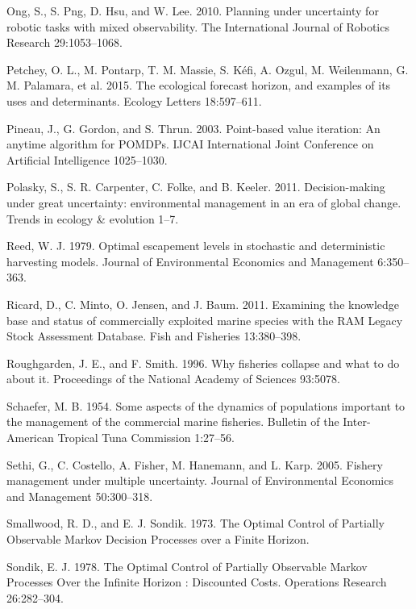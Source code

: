 \documentclass[3p]{elsarticle} %
\begin{document}
\hypertarget{ref-Ong2010}{}
Ong, S., S. Png, D. Hsu, and W. Lee. 2010. Planning under uncertainty
for robotic tasks with mixed observability. The International Journal of
Robotics Research 29:1053--1068.

\hypertarget{ref-Petchy2015}{}
Petchey, O. L., M. Pontarp, T. M. Massie, S. Kéfi, A. Ozgul, M.
Weilenmann, G. M. Palamara, et al. 2015. The ecological forecast
horizon, and examples of its uses and determinants. Ecology Letters
18:597--611.

\hypertarget{ref-Pineau2003}{}
Pineau, J., G. Gordon, and S. Thrun. 2003. Point-based value iteration:
An anytime algorithm for POMDPs. IJCAI International Joint Conference on
Artificial Intelligence 1025--1030.

\hypertarget{ref-Polasky2011}{}
Polasky, S., S. R. Carpenter, C. Folke, and B. Keeler. 2011.
Decision-making under great uncertainty: environmental management in an
era of global change. Trends in ecology \& evolution 1--7.

\hypertarget{ref-Reed1979}{}
Reed, W. J. 1979. Optimal escapement levels in stochastic and
deterministic harvesting models. Journal of Environmental Economics and
Management 6:350--363.

\hypertarget{ref-RAM}{}
Ricard, D., C. Minto, O. Jensen, and J. Baum. 2011. Examining the
knowledge base and status of commercially exploited marine species with
the RAM Legacy Stock Assessment Database. Fish and Fisheries
13:380--398.

\hypertarget{ref-Roughgarden1996}{}
Roughgarden, J. E., and F. Smith. 1996. Why fisheries collapse and what
to do about it. Proceedings of the National Academy of Sciences 93:5078.

\hypertarget{ref-Schaefer1954}{}
Schaefer, M. B. 1954. Some aspects of the dynamics of populations
important to the management of the commercial marine fisheries. Bulletin
of the Inter-American Tropical Tuna Commission 1:27--56.

\hypertarget{ref-Sethi2005}{}
Sethi, G., C. Costello, A. Fisher, M. Hanemann, and L. Karp. 2005.
Fishery management under multiple uncertainty. Journal of Environmental
Economics and Management 50:300--318.

\hypertarget{ref-Smallwood1973}{}
Smallwood, R. D., and E. J. Sondik. 1973. The Optimal Control of
Partially Observable Markov Decision Processes over a Finite Horizon.

\hypertarget{ref-Sondik1978}{}
Sondik, E. J. 1978. The Optimal Control of Partially Observable Markov
Processes Over the Infinite Horizon : Discounted Costs. Operations
Research 26:282--304.
\end{document}
